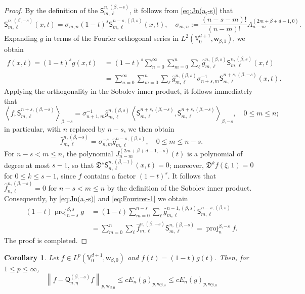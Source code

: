 \documentclass{amsart}
\newtheorem{cor}[thm]{Corollary}
\theoremstyle{remark}
\def\sw{{\mathsf w}}
\def\sQ{{\mathsf Q}}
\def\sS{{\mathsf S}}
\def\fD{{\mathfrak D}}
\def\b{{\beta}}
\def\s{\sigma}
\def\VV{{\mathbb V}}
\def\proj{\operatorname{proj}}
\begin{document}
\begin{proof}
By the definition of the $\sS_{m,\ell}^{n,(\b,-s)}$, it follows from \eqref{eq:Jn(a,-s)} that
$$
 \sS_{m,\ell}^{n, (\b,-s)} (x,t)= \s_{m,n} (1-t)^s \sS_{m,\ell}^{n-s, (\b,s)}(x,t), \quad
 \s_{m,n} :=  \frac{(n-s-m)!}{(n-m)!} A_{n-m}^{(2m+\b+d-1,0)}.
$$
Expanding $g$ in terms of the Fourier orthogonal series in $L^2(\VV_0^{d+1}, \sw_{\b,1})$, we obtain
\begin{align*}
 f(x,t) = (1-t)^s g(x,t) \,& = (1-t)^s \sum_{n=0}^\infty \sum_{m=0}^n \sum_\ell \hat g_{m,\ell}^{n, (\b,s)}
    \sS_{m,\ell}^{n, (\b,s)}(x,t) \\
    & = \sum_{n=0}^\infty \sum_{m=0}^n \sum_\ell \hat g_{m,\ell}^{n, (\b,s)}
    \s_{n+s,m}^{-1} \sS_{m,\ell}^{n+s, (\b,-s)}(x,t).
\end{align*}
Applying the orthogonality in the Sobolev inner product, it follows immediately that
$$
 \left \langle f,  \sS_{m,\ell}^{n+s, (\b,-s)} \right \rangle_{\b,-s} =
  \s_{n+1,m}^{-1} \hat g_{m,\ell}^{n,(\b,s)} \left \langle
    \sS_{m,\ell}^{n+s, (\b,-s)},  \sS_{m,\ell}^{n+s, (\b,-s)} \right \rangle_{\b,-s}, \quad 0 \le m \le n;
$$
in particular, with $n$ replaced by $n-s$, we then obtain
\begin{equation} \label{eq:Fourirer-1}
      \hat f_{m,\ell}^{n,(\b,-s)} = \s_{n,m}^{-s} \hat g_{m,\ell}^{n-s,(\b,s)}, \quad 0 \le m \le n-s.
\end{equation}
For $n-s < m \le n$, the polynomial $J_{n-m}^{(2m+\b+d-1,-s)}(t)$ is a polynomial of degree at most $s-1$,
so that $\fD^s \sS_{n,\ell}^{n, (\b,-1)}(x,t) = 0$; moreover, $\fD^k f(\xi,1) =0$ for $0 \le k \le s-1$,
since $f$ contains a factor $(1-t)^s$. It follows that $\hat f_{n,\ell}^{n,(\b,-s)} = 0$ for $n -s < m \le n$ by the
definition of the Sobolev inner product. Consequently, by \eqref{eq:Jn(a,-s)} and \eqref{eq:Fourirer-1} we
obtain
\begin{align*}
    (1-t) \proj_{n-s}^{\b,s} g\, & = (1-t) \sum_{m=0}^{n-s} \sum_\ell \hat g_{m,\ell}^{n-1,(\b,s)} \sS_{m,\ell}^{n-s, (\b,s)} \\
                   & = \sum_{m=0}^{n} \sum_\ell \hat f_{m,\ell}^{n,(\b,-s)} \sS_{m,\ell}^{n, (\b,-s)} = \proj_{n}^{\b,-s}f.
\end{align*}
The proof is completed.
\end{proof}

\begin{cor}
Let $f \in L^p(\VV_0^{d+1},\sw_{\b,0})$ and $f(t) = (1-t) g(t)$. Then, for $1 \le p \le \infty$,
$$
   \left \| f - \sQ_{n,\eta}^{(\beta, -s)} f \right\|_{p, \sw_{\b,0}}
    \le c E_n\left(g \right)_{p, \sw_{\b,s}} \le c E_n\left(g \right)_{p, \sw_{\b,0}}
$$
\end{cor}
\end{document}
